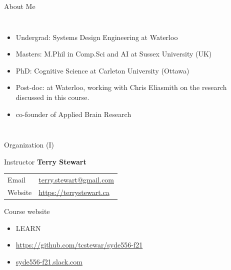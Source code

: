 \documentclass[aspectratio=169]{beamer}
\begin{document}
\begin{frame}{About Me}
\begin{columns}[T]
\begin{itemize}
\begin{itemize}
			\end{itemize}
			\item Undergrad: Systems Design Engineering at Waterloo
			\item Masters: M.Phil in Comp.Sci and AI at Sussex University (UK)
			\item PhD: Cognitive Science at Carleton University (Ottawa)
			\item Post-doc: at Waterloo, working with Chris Eliasmith on the research discussed in this course.
			\item co-founder of Applied Brain Research
		\end{itemize}
	\end{columns}
\end{frame}



\begin{frame}{Organization (I)}
	\begin{block}{Instructor}
		\vspace{2mm}
		\textbf{Terry Stewart}\\[2mm]
		\hspace{-2.5mm}\begin{tabular}{l l}
			Email & \url{terry.stewart@gmail.com}\\
			Website & \url{https://terrystewart.ca}\\
		\end{tabular}
	\end{block}
 
	\vfill

	\begin{block}{Course website}
		\begin{itemize}
			\item LEARN
			\item \url{https://github.com/tcstewar/syde556-f21}
			\item \url{syde556-f21.slack.com}
		\end{itemize}
	\end{block}
\end{frame}
\end{document}
